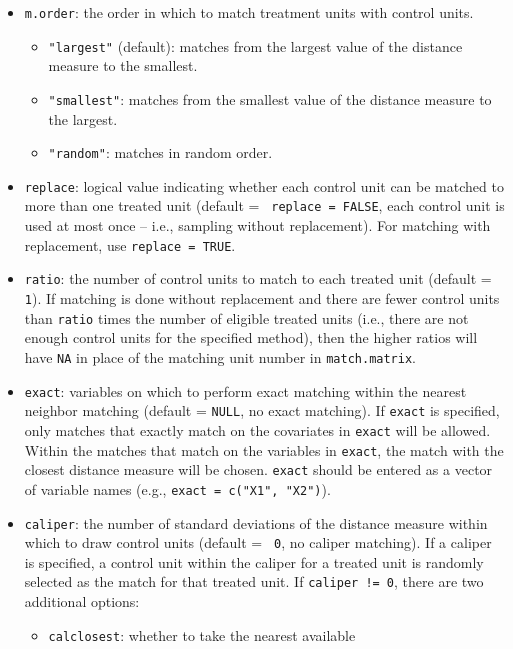 \begin{itemize}
\item \texttt{m.order}: the order in which to match treatment units
  with control units.
  \begin{itemize}
  \item {\tt "largest"} (default): matches from the largest value of
    the distance measure to the smallest.
  \item {\tt "smallest"}: matches from the smallest value of the
    distance measure to the largest.
  \item {\tt "random"}: matches in random order.
  \end{itemize}
\item \texttt{replace}: logical value indicating whether each control
  unit can be matched to more than one treated unit (default = {\tt
    replace = FALSE}, each control unit is used at most once -- i.e.,
  sampling without replacement). For matching with replacement, use
  \texttt{replace = TRUE}.
\item \texttt{ratio}: the number of control units to match to each
  treated unit (default = {\tt 1}).  If matching is done without
  replacement and there are fewer control units than {\tt ratio} times
  the number of eligible treated units (i.e., there are not enough
  control units for the specified method), then the higher ratios will
  have \texttt{NA} in place of the matching unit number in
  \texttt{match.matrix}.
\item \texttt{exact}: variables on which to perform exact matching
  within the nearest neighbor matching (default = {\tt NULL}, no exact
  matching).  If \texttt{exact} is specified, only matches that
  exactly match on the covariates in \texttt{exact} will be allowed.
  Within the matches that match on the variables in \texttt{exact},
  the match with the closest distance measure will be chosen.
  \texttt{exact} should be entered as a vector of variable names
  (e.g., \texttt{exact = c("X1", "X2")}).
\item \texttt{caliper}: the number of standard deviations of the
  distance measure within which to draw control units (default = {\tt
    0}, no caliper matching).  If a caliper is specified, a control
  unit within the caliper for a treated unit is randomly selected as
  the match for that treated unit.  If \texttt{caliper != 0}, there
  are two additional options:
  \begin{itemize} 
  \item \texttt{calclosest}: whether to take the nearest available

\end{itemize}
\end{itemize}

